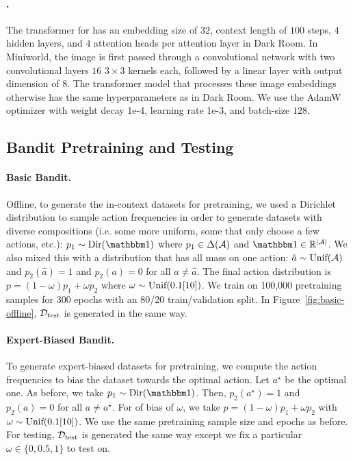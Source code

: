 \paragraph{\macroName{}.} The transformer for \macroName{} has an embedding size of $32$, context length of $100$ steps, $4$ hidden layers, and $4$ attention heads per attention layer in Dark Room. In Miniworld, the image is first passed through a convolutional network with two convolutional layers $16$ $3 \times 3$ kernels each, followed by a linear layer with output dimension of $8$. The transformer model that processes these image embeddings otherwise has the same hyperparameters as in Dark Room. We use the AdamW optimizer with weight decay 1e-4, learning rate 1e-3, and batch-size $128$.


\subsection{Bandit Pretraining and Testing}
\label{app:bandit-pretrain-data}

\paragraph{Basic Bandit. }
Offline, to generate the in-context datasets for pretraining, we used a Dirichlet distribution to sample action frequencies in order to generate datasets with diverse compositions (i.e. some more uniform, some that only choose a few actions, etc.):
$p_1 \sim \text{Dir}(\one)$ 
where $p_1 \in \Delta(\mathcal{A})$ and $\one \in \RR^{|\Acal|}$. We also mixed this with a distribution that has all mass on one action: $\hat a \sim \text{Unif}(\mathcal{A})$ and $p_2(\hat a) = 1$ and $p_2(a) = 0$ for all $a \neq \hat a$. The final action distribution is $p = (1 - \omega)  p_1 + \omega p_2$ where $\omega \sim \text{Unif}(0.1 [10])$.  We train on 100,000 pretraining samples for 300 epochs with an 80/20 train/validation split. In Figure~\ref{fig:basic-offline}, $\mathcal{D}_{\text{test}}$ is generated in the same way.




\paragraph{Expert-Biased Bandit.} To generate expert-biased datasets for pretraining, we compute the action frequencies to bias the dataset towards the optimal action. Let $a^\star$ be the optimal one. As before, we take $p_1 \sim \text{Dir}(\one)$. Then, $p_2(a^\star) = 1$ and $p_2(a) = 0$ for all $a \neq a^\star$. For of bias of $\omega$, we take $p = (1 - \omega) p_1 + \omega p_2$ with $\omega \sim \text{Unif}(0.1 [10])$. We use the same pretraining sample size and epochs as before. For testing, $\mathcal{D}_{\text{test}}$ is generated the same way except we fix a particular $\omega \in \{0, 0.5, 1\}$ to test on.


